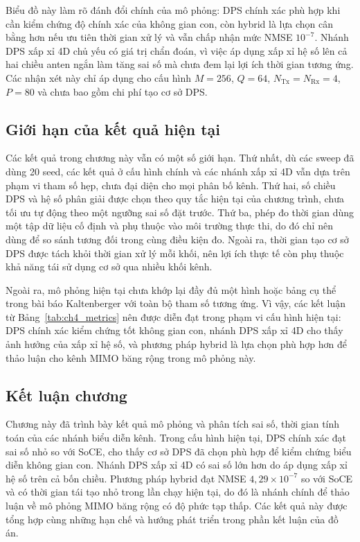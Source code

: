Biểu đồ này làm rõ đánh đổi chính của mô phỏng: DPS chính xác phù hợp khi cần kiểm chứng độ chính xác của không gian con, còn hybrid là lựa chọn cân bằng hơn nếu ưu tiên thời gian xử lý và vẫn chấp nhận mức NMSE \(10^{-7}\). Nhánh DPS xấp xỉ 4D chủ yếu có giá trị chẩn đoán, vì việc áp dụng xấp xỉ hệ số lên cả hai chiều anten ngắn làm tăng sai số mà chưa đem lại lợi ích thời gian tương ứng. Các nhận xét này chỉ áp dụng cho cấu hình \(M=256\), \(Q=64\), \(N_{\mathrm{Tx}}=N_{\mathrm{Rx}}=4\), \(P=80\) và chưa bao gồm chi phí tạo cơ sở DPS.

\subsection{Giới hạn của kết quả hiện tại}
\label{subsec:ch4_limitations}

Các kết quả trong chương này vẫn có một số giới hạn. Thứ nhất, dù các sweep đã dùng 20 seed, các kết quả ở cấu hình chính và các nhánh xấp xỉ 4D vẫn dựa trên phạm vi tham số hẹp, chưa đại diện cho mọi phân bố kênh. Thứ hai, số chiều DPS và hệ số phân giải được chọn theo quy tắc hiện tại của chương trình, chưa tối ưu tự động theo một ngưỡng sai số đặt trước. Thứ ba, phép đo thời gian dùng một tập dữ liệu cố định và phụ thuộc vào môi trường thực thi, do đó chỉ nên dùng để so sánh tương đối trong cùng điều kiện đo. Ngoài ra, thời gian tạo cơ sở DPS được tách khỏi thời gian xử lý mỗi khối, nên lợi ích thực tế còn phụ thuộc khả năng tái sử dụng cơ sở qua nhiều khối kênh.

Ngoài ra, mô phỏng hiện tại chưa khớp lại đầy đủ một hình hoặc bảng cụ thể trong bài báo Kaltenberger với toàn bộ tham số tương ứng. Vì vậy, các kết luận từ Bảng~\ref{tab:ch4_metrics} nên được diễn đạt trong phạm vi cấu hình hiện tại: DPS chính xác kiểm chứng tốt không gian con, nhánh DPS xấp xỉ 4D cho thấy ảnh hưởng của xấp xỉ hệ số, và phương pháp hybrid là lựa chọn phù hợp hơn để thảo luận cho kênh MIMO băng rộng trong mô phỏng này.

\subsection{Kết luận chương}
\label{subsec:ch4_conclusion}

Chương này đã trình bày kết quả mô phỏng và phân tích sai số, thời gian tính toán của các nhánh biểu diễn kênh. Trong cấu hình hiện tại, DPS chính xác đạt sai số nhỏ so với SoCE, cho thấy cơ sở DPS đã chọn phù hợp để kiểm chứng biểu diễn không gian con. Nhánh DPS xấp xỉ 4D có sai số lớn hơn do áp dụng xấp xỉ hệ số trên cả bốn chiều. Phương pháp hybrid đạt NMSE \(4{,}29\times10^{-7}\) so với SoCE và có thời gian tái tạo nhỏ trong lần chạy hiện tại, do đó là nhánh chính để thảo luận về mô phỏng MIMO băng rộng có độ phức tạp thấp. Các kết quả này được tổng hợp cùng những hạn chế và hướng phát triển trong phần kết luận của đồ án.

\cleardoublepage
